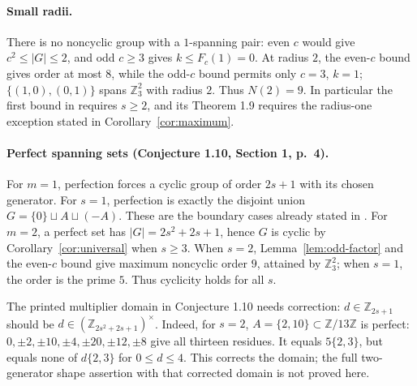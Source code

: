 \documentclass[11pt]{article}
\newcommand{\Z}{\mathbb Z}
\begin{document}
\paragraph{Small radii.}
There is no noncyclic group with a $1$-spanning pair:
even $c$ would give $c^2\le|G|\le2$, and odd $c\ge3$ gives
$k\le F_c(1)=0$. At radius $2$, the even-$c$ bound gives order at
most $8$, while the odd-$c$ bound permits only $c=3$, $k=1$;
$\{(1,0),(0,1)\}$ spans $\Z_3^2$ with radius $2$.
Thus $N(2)=9$. In particular the first bound in
\cite[Theorem 1.7]{BB} requires $s\ge2$, and its Theorem 1.9
requires the radius-one exception stated in Corollary~\ref{cor:maximum}.

\paragraph{Perfect spanning sets (Conjecture 1.10, Section 1, p.~4).}
For $m=1$, perfection forces a cyclic group of order $2s+1$ with its
chosen generator. For $s=1$, perfection is exactly the disjoint union
$G=\{0\}\sqcup A\sqcup(-A)$. These are the boundary cases already
stated in \cite{BB}. For $m=2$, a perfect set has
$|G|=2s^2+2s+1$, hence $G$ is cyclic by Corollary~\ref{cor:universal}
when $s\ge3$. When $s=2$, Lemma~\ref{lem:odd-factor} and the even-$c$
bound give maximum noncyclic order $9$, attained by $\Z_3^2$;
when $s=1$, the order is the prime $5$. Thus cyclicity holds for all $s$.

The printed multiplier domain in Conjecture 1.10 needs correction:
$d\in\Z_{2s+1}$ should be $d\in(\Z_{2s^2+2s+1})^\times$.
Indeed, for $s=2$, $A=\{2,10\}\subset\Z/13\Z$ is perfect:
$0,\pm2,\pm10,\pm4,\pm20,\pm12,\pm8$ give all thirteen residues.
It equals $5\{2,3\}$, but equals none of $d\{2,3\}$ for
$0\le d\le4$. This corrects the domain; the full two-generator
shape assertion with that corrected domain is not proved here.
\end{document}

